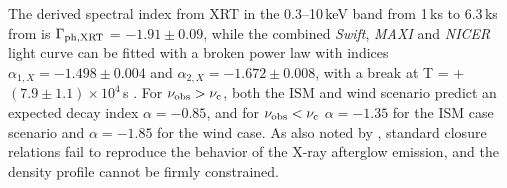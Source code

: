 \documentclass[preprint]{aastex631}
\newcommand\mac[1]{{\color{orange}[[[MA: #1]]]}} %
\begin{document}
The derived spectral index from XRT in the 0.3--10\,keV band from 1\,ks to 6.3\,ks from \trig is $\Gamma_{\rm ph, XRT}$ = $-1.91 \pm 0.09$, while the combined {\it Swift}, {\it MAXI} and {\it NICER} light curve can be fitted with a broken power law with indices $\alpha_{1,X} = -1.498 \pm 0.004$ and  $\alpha_{2,X} = -1.672 \pm 0.008$, with a break at T = \trig + $(7.9 \pm 1.1) \times 10^{4}$\,s \citep{BOAT_SWIFT}. 
For $\nu_{\rm obs} > \nu_{\rm c}$, both the ISM and wind scenario predict an expected decay index $\alpha = -0.85$, and for $\nu_{\rm obs} < \nu_{\rm c}$ $\alpha = -1.35$ for the ISM case scenario and $\alpha = -1.85$ for the wind case. As also noted by \citet{BOAT_SWIFT}, standard closure relations \citep{Racusin_2009} fail to reproduce the behavior of the X-ray afterglow emission, and the density profile cannot be firmly constrained.


\end{document}

